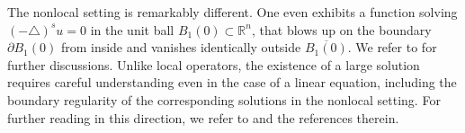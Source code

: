 \documentclass{amsart}
\begin{document}
The nonlocal setting is remarkably different. 
One even exhibits a function solving $(-\triangle)^{s} u =0$ in the unit ball $B_{1}(0) \subset \mathbb{R}^{n}$, that blows up on the boundary $\partial B_{1}(0)$ from inside and vanishes identically outside $\overline{B_{1}(0)}$. We refer to \cite{Abatangelo2015LargesHarmonic, Bogdan-book} for further discussions.
Unlike local operators, the existence of a large solution requires careful understanding even in the case of a linear equation, including the boundary regularity of the corresponding solutions in the nonlocal setting. For further reading in this direction, we refer to \cite{ROSOTON2014275, Grubb2015, RosSerra2016, AbatangeloVazquez2023} and the references therein.
\end{document}
